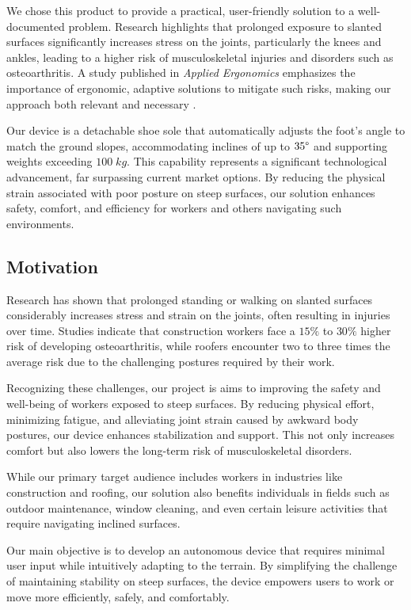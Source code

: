 \documentclass[lettersize,journal]{IEEEtran}
\begin{document}
We chose this product to provide a practical, user-friendly solution to a well-documented problem. Research highlights that prolonged exposure to slanted surfaces significantly increases stress on the joints, particularly the knees and ankles, leading to a higher risk of musculoskeletal injuries and disorders such as osteoarthritis. A study published in \textit{Applied Ergonomics} emphasizes the importance of ergonomic, adaptive solutions to mitigate such risks, making our approach both relevant and necessary \cite{ref1}.

Our device is a detachable shoe sole that automatically adjusts the foot’s angle to match the ground slopes, accommodating inclines of up to $35\degree$ and supporting weights exceeding $100 \;kg$. This capability represents a significant technological advancement, far surpassing current market options. By reducing the physical strain associated with poor posture on steep surfaces, our solution enhances safety, comfort, and efficiency for workers and others navigating such environments.


\subsection{Motivation}

Research has shown that prolonged standing or walking on slanted surfaces considerably increases stress and strain on the joints, often resulting in injuries over time. Studies indicate that construction workers face a $15\%$ to $30\%$ higher risk of developing osteoarthritis, while roofers encounter two to three times the average risk due to the challenging postures required by their work. \cite{ref1}

Recognizing these challenges, our project is aims to improving the safety and well-being of workers exposed to steep surfaces. By reducing physical effort, minimizing fatigue, and alleviating joint strain caused by awkward body postures, our device enhances stabilization and support. This not only increases comfort but also lowers the long-term risk of musculoskeletal disorders.

While our primary target audience includes workers in industries like construction and roofing, our solution also benefits individuals in fields such as outdoor maintenance, window cleaning, and even certain leisure activities that require navigating inclined surfaces.

Our main objective is to develop an autonomous device that requires minimal user input while intuitively adapting to the terrain. By simplifying the challenge of maintaining stability on steep surfaces, the device empowers users to work or move more efficiently, safely, and comfortably.
\end{document}
